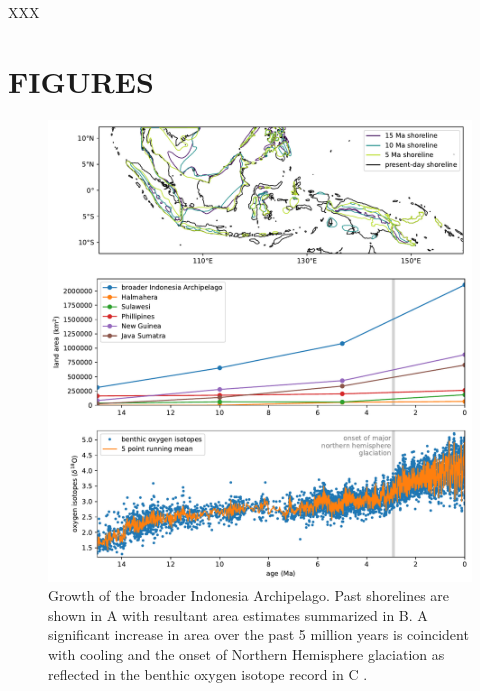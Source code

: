 \documentclass[11pt,letterpaper]{article}
\begin{document}
XXX

\clearpage
\newpage

\section*{FIGURES}

\begin{figure}
    \centering
    \includegraphics{Manuscript/Figures/shoreline_growth.pdf}
    \caption{Growth of the broader Indonesia Archipelago. Past shorelines are shown in A with resultant area estimates summarized in B. A significant increase in area over the past 5 million years is coincident with cooling and the onset of Northern Hemisphere glaciation as reflected in the benthic oxygen isotope record in C \cite{Zachos2008a}.}
    \label{fig:shoreline_growth}
\end{figure}

\clearpage
\newpage
\footnotesize

\singlespacing



\end{document}
